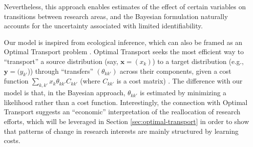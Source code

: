 \documentclass{article}
\begin{document}
Nevertheless, this approach enables estimates of the effect of certain variables on transitions between research areas, and the Bayesian formulation naturally accounts for the uncertainty associated with limited identifiability.

Our model is inspired from ecological inference, which can also be framed as an Optimal Transport problem \citep{muzellec2017tsallis,li2019learning}. Optimal Transport seeks the most efficient way to  ``transport'' a source distribution (say, $\bm{x}=(x_k)$) to a target distribution (e.g., $\bm{y}=(y_{k'}$)) through ``transfers'' $(\theta_{kk'})$ across their components, given a cost function $\sum_{k,k'} x_{k} \theta_{kk'}C_{kk'}$ (where $C_{kk'}$ is a cost matrix) \citep{Peyre2018}. The difference with our model is that, in the Bayesian approach, $\theta_{kk'}$ is estimated by minimizing a likelihood rather than a cost function. Interestingly, the connection with Optimal Transport suggests an ``economic'' interpretation of the reallocation of research efforts, which will be leveraged in Section \ref{sec:optimal-transport} in order to show that patterns of change in research interests are mainly structured by learning costs. %


\end{document}
